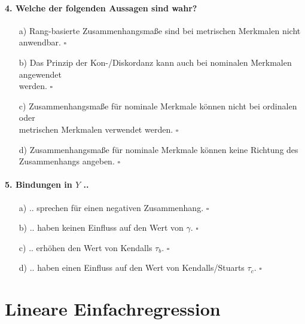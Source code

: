 \documentclass[a4paper]{article}
\begin{document}
\paragraph{4. Welche der folgenden Aussagen sind wahr?}

\begin{itemize}
    \item[a)] Rang-basierte Zusammenhangsmaße sind bei metrischen Merkmalen nicht anwendbar. \hfill $\square$
    \item[b)] Das Prinzip der Kon-/Diskordanz kann auch bei nominalen Merkmalen angewendet\\werden. \hfill $\square$
    \item[c)] Zusammenhangsmaße für nominale Merkmale können nicht bei ordinalen oder\\metrischen Merkmalen verwendet werden. \hfill $\square$
    \item[d)] Zusammenhangsmaße für nominale Merkmale können keine Richtung des\\Zusammenhangs angeben. \hfill $\square$
\end{itemize}

\paragraph{5. Bindungen in $Y$ ..}

\begin{itemize}
    \item[a)] .. sprechen für einen negativen Zusammenhang. \hfill $\square$
    \item[b)] .. haben keinen Einfluss auf den Wert von $\gamma$. \hfill $\square$
    \item[c)] .. erhöhen den Wert von Kendalls $\tau_b$. \hfill $\square$
    \item[d)] .. haben einen Einfluss auf den Wert von Kendalls/Stuarts $\tau_c$. \hfill $\square$
\end{itemize}

\newpage


\section{Lineare Einfachregression}\label{sec:lineare Einfachregression}
\end{document}
